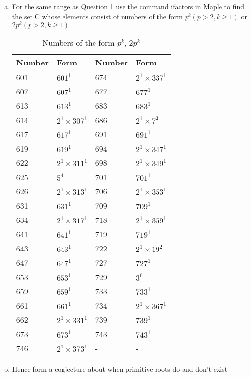 \documentclass[11pt,a4paper]{article}
\begin{document}
\begin{enumerate}[1.]
\begin{enumerate}[a.]
			\item For the same range as Question 1 use the command ifactors in Maple to find the set C whose elements consist of numbers of the form $p^k(p > 2, k \ge 1)$ or $2p^k(p > 2, k \ge 1)$
			\begin{table}[H]
				\centering
				\begin{tabular}{|l|l|l|l|}
					\hline
					Number & Form & Number & Form\\ \hline
					601 & $601^1$ & 674 & $2^1 \times 337^1$  \\ \hline
					607 & $607^1$ & 677 & $677^1$  \\ \hline
					613 & $613^1$ & 683 & $683^1$  \\ \hline
					614 & $2^1 \times 307^1$ & 686 & $2^1 \times 7^3$  \\ \hline
					617 & $617^1$ & 691 & $691^1$  \\ \hline
					619 & $619^1$ & 694 & $2^1 \times 347^1$  \\ \hline
					622 & $2^1 \times 311^1$ & 698 & $2^1 \times 349^1$  \\ \hline
					625 & $5^4$ & 701 & $701^1$  \\ \hline
					626 & $2^1 \times 313^1$ & 706 & $2^1 \times 353^1$  \\ \hline
					631 & $631^1$ & 709 & $709^1$  \\ \hline
					634 & $2^1 \times 317^1$ & 718 & $2^1 \times 359^1$  \\ \hline
					641 & $641^1$ & 719 & $719^1$  \\ \hline
					643 & $643^1$ & 722 & $2^1 \times 19^2$  \\ \hline
					647 & $647^1$ & 727 & $727^1$  \\ \hline
					653 & $653^1$ & 729 & $3^6$  \\ \hline
					659 & $659^1$ & 733 & $733^1$  \\ \hline
					661 & $661^1$ & 734 & $2^1 \times 367^1$  \\ \hline
					662 & $2^1 \times 331^1$ & 739 & $739^1$  \\ \hline
					673 & $673^1$ & 743 & $743^1$  \\ \hline
					746 & $2^1 \times 373^1$ & - & - \\ \hline					
				\end{tabular}
				\caption{Numbers of the form $p^k$, $2p^k$}
				\label{table:number_pk_2pk}
			\end{table}

			\item Hence form a conjecture about when primitive roots do and don’t exist
		\end{enumerate}
			


\end{enumerate}
\end{document}
